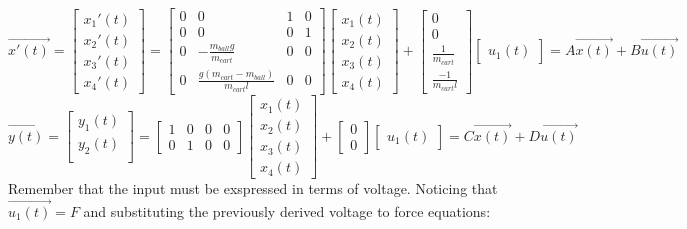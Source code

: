 \documentclass[12pt]{article} %
\begin{document}
\begin{equation}
 \vec{x'(t)} = 
\begin{bmatrix}
x_1'(t) \\
x_2'(t) \\
x_3'(t) \\
x_4'(t)
\end{bmatrix}
= 
\begin{bmatrix}
0 & 0 & 1 & 0 \\
0 & 0 & 0 & 1 \\
0 & -\frac{m_{ball}g}{m_{cart}} & 0 & 0 \\
0 & \frac{g(m_{cart} - m_{ball})}{m_{cart}l} & 0 & 0
\end{bmatrix}
\begin{bmatrix}
x_1(t) \\
x_2(t) \\
x_3(t) \\
x_4(t)
\end{bmatrix}
+ 
\begin{bmatrix}
0 \\
0 \\
\frac{1}{m_{cart}} \\
\frac{-1}{m_{cart}l}
\end{bmatrix}
\begin{bmatrix}
u_1(t)
\end{bmatrix}
= A\vec{x(t)} + B\vec{u(t)}
\end{equation}
\begin{equation}
 \vec{y(t)} = 
\begin{bmatrix}
y_1(t) \\
y_2(t) \\
\end{bmatrix}
= 
\begin{bmatrix}
1 & 0 & 0 & 0 \\
0 & 1 & 0 & 0 
\end{bmatrix}
\begin{bmatrix}
x_1(t) \\
x_2(t) \\
x_3(t) \\
x_4(t)
\end{bmatrix}
+
\begin{bmatrix}
0 \\
0
\end{bmatrix}
\begin{bmatrix}
u_1(t)
\end{bmatrix}
= C\vec{x(t)} + D\vec{u(t)}
\end{equation}
Remember that the input must be exspressed in terms of voltage. Noticing that $\vec{u_1(t)} = F$ and substituting the previously derived voltage to force equations:
\end{document}
